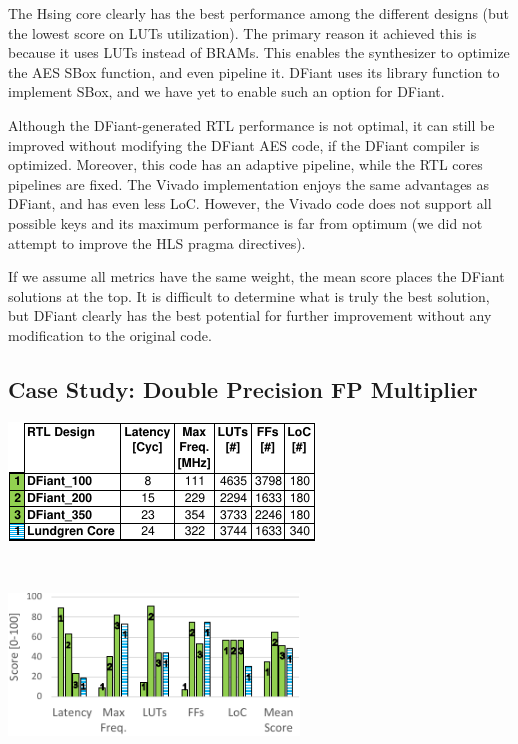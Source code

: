 The Hsing core clearly has the best performance among the different designs (but the lowest score on LUTs utilization). The primary reason it achieved this is because it uses LUTs instead of BRAMs. This enables the synthesizer to optimize the AES SBox function, and even pipeline it. DFiant uses its  library function to implement SBox, and we have yet to enable such an option for DFiant. 

Although the DFiant-generated RTL performance is not optimal, it can still  be improved without modifying the DFiant AES code, if the DFiant compiler is optimized. Moreover, this code has an adaptive pipeline, while the RTL cores pipelines are fixed. The Vivado implementation enjoys the same advantages as DFiant, and has even less LoC. However, the Vivado code does not support all possible keys and its maximum performance is far from optimum (we did not attempt to improve the HLS pragma directives).

If we assume all metrics have the same weight, the mean score places the DFiant solutions at the top. It is difficult to determine what is truly the best solution, but DFiant clearly has the best potential for further improvement without any modification to the original code.

           
\subsection{Case Study: Double Precision FP Multiplier}
\begin{table}[t!]
	\centering
	\setlength\tabcolsep{2pt}
	\scriptsize
	  \begin{minipage}[t][4.8cm][t]{0.8\linewidth}
	    \centering
	    \label{tbl:FP_Compare_Table}
	    \includegraphics[scale=1.2]{graphics/FP_Compare_Table.pdf} 
	  \end{minipage}
    \\
	  \begin{minipage}[b][3.8cm][b]{\linewidth}
	    \centering
	    \includegraphics[height=3.8cm]{graphics/FP_Compare.pdf} 
	    \label{fig:FP_Compare_Graph}
	  \end{minipage}
\end{table}

